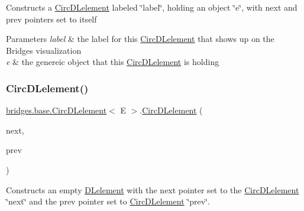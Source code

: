 Constructs a \mbox{\hyperlink{classbridges_1_1base_1_1_circ_d_lelement}{Circ\+D\+Lelement}} labeled \char`\"{}label\char`\"{}, holding an object \char`\"{}e\char`\"{}, with next and prev pointers set to itself


\begin{DoxyParams}{Parameters}
{\em label} & the label for this \mbox{\hyperlink{classbridges_1_1base_1_1_circ_d_lelement}{Circ\+D\+Lelement}} that shows up on the Bridges visualization \\
\hline
{\em e} & the genereic object that this \mbox{\hyperlink{classbridges_1_1base_1_1_circ_d_lelement}{Circ\+D\+Lelement}} is holding \\
\hline
\end{DoxyParams}
\mbox{\label{classbridges_1_1base_1_1_circ_d_lelement_a98a471fc3225ed80595e1ffdb377e336}} 
\subsubsection{\texorpdfstring{CircDLelement()}{CircDLelement()}\hspace{0.1cm}{\footnotesize\ttfamily [3/4]}}
{\footnotesize\ttfamily \mbox{\hyperlink{classbridges_1_1base_1_1_circ_d_lelement}{bridges.\+base.\+Circ\+D\+Lelement}}$<$ E $>$.\mbox{\hyperlink{classbridges_1_1base_1_1_circ_d_lelement}{Circ\+D\+Lelement}} (\begin{DoxyParamCaption}\item[{\mbox{\hyperlink{classbridges_1_1base_1_1_circ_d_lelement}{Circ\+D\+Lelement}}$<$ E $>$}]{next,  }\item[{\mbox{\hyperlink{classbridges_1_1base_1_1_circ_d_lelement}{Circ\+D\+Lelement}}$<$ E $>$}]{prev }\end{DoxyParamCaption})}

Constructs an empty \mbox{\hyperlink{classbridges_1_1base_1_1_d_lelement}{D\+Lelement}} with the next pointer set to the \mbox{\hyperlink{classbridges_1_1base_1_1_circ_d_lelement}{Circ\+D\+Lelement}} \char`\"{}next\char`\"{} and the prev pointer set to \mbox{\hyperlink{classbridges_1_1base_1_1_circ_d_lelement}{Circ\+D\+Lelement}} \char`\"{}prev\char`\"{}.


